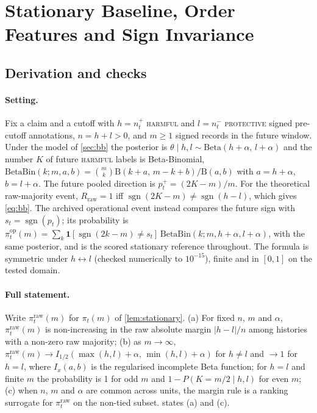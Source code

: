 \documentclass[11pt]{article}
\newcommand{\sgn}{\operatorname{sgn}}
\newcommand{\BB}{\mathrm{BetaBin}}
\begin{document}
\section{Stationary Baseline, Order Features and Sign Invariance}
\label{app:bb}
\subsection{Derivation and checks}
\paragraph{Setting.} Fix a claim and a cutoff with $h=n^{+}_t$ \textsc{harmful} and $l=n^{-}_t$
\textsc{protective} signed pre-cutoff annotations, $n=h+l>0$, and $m\ge1$ signed records in the
future window. Under the model of \cref{sec:bb} the posterior is
$\theta\mid h,l\sim\mathrm{Beta}(h+\alpha,\,l+\alpha)$ and the number $K$ of future \textsc{harmful}
labels is Beta-Binomial, $\BB(k;m,a,b)=\binom{m}{k}\mathrm{B}(k+a,\,m-k+b)/\mathrm{B}(a,b)$ with
$a=h+\alpha$, $b=l+\alpha$. The future pooled direction is $p^{+}_t=(2K-m)/m$. For the theoretical raw-majority event,
$R_{\mathrm{raw}}=1$ iff $\sgn(2K-m)\neq\sgn(h-l)$, which gives \cref{eq:bb}. The archived
operational event instead compares the future sign with $s_t=\sgn(p_t)$; its probability is
$\pi^{\mathrm{op}}_t(m)=\sum_k\mathbf{1}[\sgn(2k-m)\ne s_t]\,\BB(k;m,h{+}\alpha,l{+}\alpha)$, with the same
posterior, and is the scored stationary reference throughout. The formula is symmetric under
$h\leftrightarrow l$ (checked numerically to $10^{-15}$), finite and in $[0,1]$ on the tested
domain.

\paragraph{Full statement.} Write $\pi^{\mathrm{raw}}_t(m)$ for $\pi_t(m)$ of \cref{lem:stationary}.
(a) For fixed $n$, $m$ and $\alpha$, $\pi^{\mathrm{raw}}_t(m)$ is non-increasing in the raw absolute
margin $|h-l|/n$ among histories with a non-zero raw majority; (b) as $m\to\infty$,
$\pi^{\mathrm{raw}}_t(m)\to I_{1/2}(\max(h,l)+\alpha,\,\min(h,l)+\alpha)$ for $h\ne l$ and $\to1$ for
$h=l$, where $I_x(a,b)$ is the regularised incomplete Beta function; for $h=l$ and finite $m$ the
probability is 1 for odd $m$ and $1-P(K=m/2\mid h,l)$ for even $m$; (c) when $n$, $m$ and $\alpha$
are common across units, the margin rule is a ranking surrogate for $\pi^{\mathrm{raw}}_t$ on the
non-tied subset.  states (a) and (c).
\end{document}
